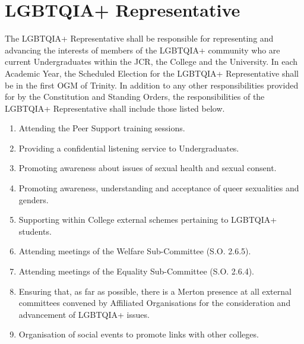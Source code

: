 \section{LGBTQIA+ Representative}
\npara The LGBTQIA+ Representative shall be responsible for representing and advancing the interests of members of the LGBTQIA+ community who are current Undergraduates within the JCR, the College and the University.
\npara In each Academic Year, the Scheduled Election for the LGBTQIA+ Representative shall be in the first OGM of Trinity.
\npara In addition to any other responsibilities provided for by the Constitution and Standing Orders, the responsibilities of the LGBTQIA+ Representative shall include those listed below.
\begin{enumerate}
	\item Attending the Peer Support training sessions.
	\item Providing a confidential listening service to Undergraduates.
	\item Promoting awareness about issues of sexual health and sexual consent.
	\item Promoting awareness, understanding and acceptance of queer sexualities and genders.
	\item Supporting within College external schemes pertaining to LGBTQIA+ students.
	\item Attending meetings of the Welfare Sub-Committee (S.O. 2.6.5).
	\item Attending meetings of the Equality Sub-Committee (S.O. 2.6.4).
	\item Ensuring that, as far as possible, there is a Merton presence at all external committees convened by Affiliated Organisations for the consideration and advancement of LGBTQIA+ issues.
	\item Organisation of social events to promote links with other colleges.
\end{enumerate}

